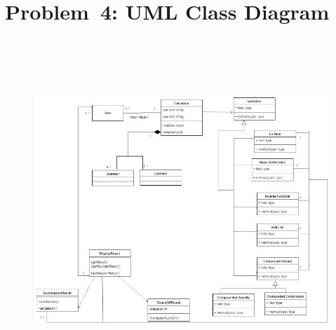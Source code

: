 \documentclass[12pt]{article}
\begin{document}
\vspace{\baselineskip}

\vspace{\baselineskip}

\vspace{\baselineskip}

\vspace{\baselineskip}

\vspace{\baselineskip}

\vspace{\baselineskip}

\vspace{\baselineskip}
\vspace{\baselineskip}\section*{Problem\ 4:  UML Class Diagram}



\begin{figure}[H]
	\begin{Center}
		\includegraphics[width=6.43in,height=5.09in]{./media/image4.png}
	\end{Center}
\end{figure}
\end{document}
